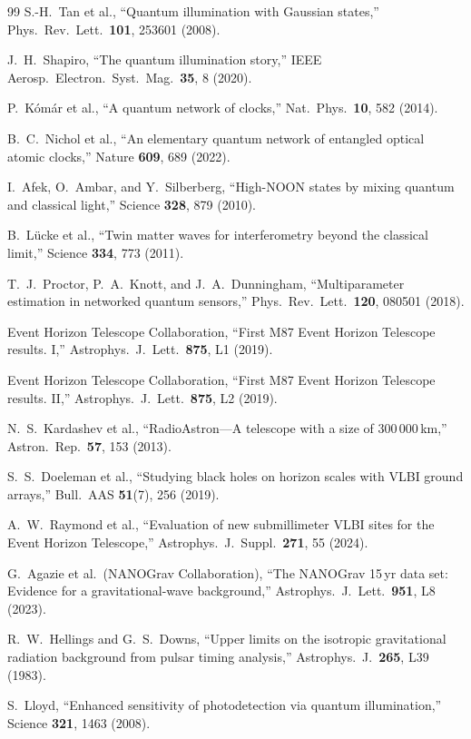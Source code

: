 \documentclass[aps,prl,twocolumn,superscriptaddress,showpacs]{revtex4-2}
\theoremstyle{definition}
\begin{document}
\begin{thebibliography}{99}
S.-H.~Tan et al.,
``Quantum illumination with Gaussian states,''
Phys.\ Rev.\ Lett.\ \textbf{101}, 253601 (2008).

J.~H.~Shapiro,
``The quantum illumination story,''
IEEE Aerosp.\ Electron.\ Syst.\ Mag.\ \textbf{35}, 8 (2020).

P.~K\'om\'ar et al.,
``A quantum network of clocks,''
Nat.\ Phys.\ \textbf{10}, 582 (2014).

B.~C.~Nichol et al.,
``An elementary quantum network of entangled optical atomic clocks,''
Nature \textbf{609}, 689 (2022).

I.~Afek, O.~Ambar, and Y.~Silberberg,
``High-NOON states by mixing quantum and classical light,''
Science \textbf{328}, 879 (2010).

B.~L\"ucke et al.,
``Twin matter waves for interferometry beyond the classical limit,''
Science \textbf{334}, 773 (2011).

T.~J.~Proctor, P.~A.~Knott, and J.~A.~Dunningham,
``Multiparameter estimation in networked quantum sensors,''
Phys.\ Rev.\ Lett.\ \textbf{120}, 080501 (2018).

Event Horizon Telescope Collaboration,
``First M87 Event Horizon Telescope results. I,''
Astrophys.\ J.\ Lett.\ \textbf{875}, L1 (2019).

Event Horizon Telescope Collaboration,
``First M87 Event Horizon Telescope results. II,''
Astrophys.\ J.\ Lett.\ \textbf{875}, L2 (2019).

N.~S.~Kardashev et al.,
``RadioAstron---A telescope with a size of 300\,000\,km,''
Astron.\ Rep.\ \textbf{57}, 153 (2013).

S.~S.~Doeleman et al.,
``Studying black holes on horizon scales with VLBI ground arrays,''
Bull.\ AAS \textbf{51}(7), 256 (2019).

A.~W.~Raymond et al.,
``Evaluation of new submillimeter VLBI sites for the Event Horizon
Telescope,''
Astrophys.\ J.\ Suppl.\ \textbf{271}, 55 (2024).

G.~Agazie et al.\ (NANOGrav Collaboration),
``The NANOGrav 15\,yr data set: Evidence for a gravitational-wave
background,''
Astrophys.\ J.\ Lett.\ \textbf{951}, L8 (2023).

R.~W.~Hellings and G.~S.~Downs,
``Upper limits on the isotropic gravitational radiation background
from pulsar timing analysis,''
Astrophys.\ J.\ \textbf{265}, L39 (1983).

S.~Lloyd,
``Enhanced sensitivity of photodetection via quantum illumination,''
Science \textbf{321}, 1463 (2008).

\end{thebibliography}
\end{document}

